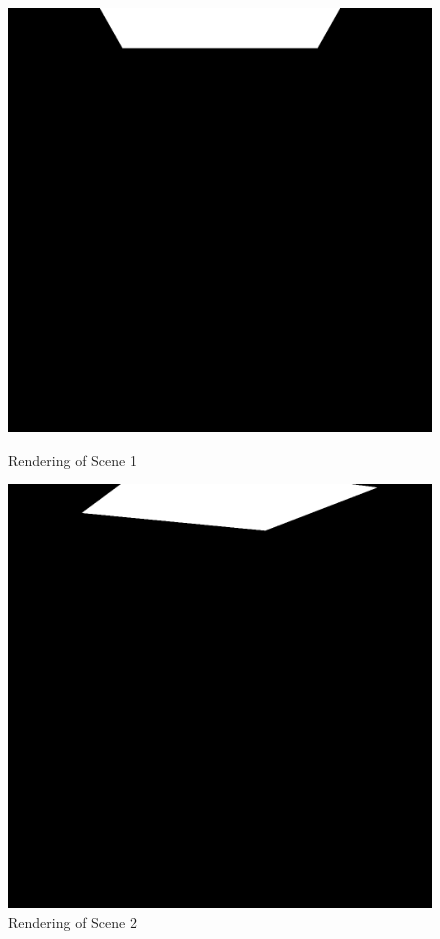 \documentclass[a4paper]{myarticle}
\begin{document}
\begin{figure}[H]
  \begin{minipage}[t]{.4\textwidth}
      \centering
      \includegraphics[width=\textwidth]{q2/scene1.png}
      \caption{Rendering of Scene 1}
  \end{minipage}
  \hfill
  \begin{minipage}[t]{.4\textwidth}
      \centering
      \includegraphics[width=\textwidth]{q2/scene2.png}
      \caption{Rendering of Scene 2}
  \end{minipage}
\end{figure}
\end{document}
